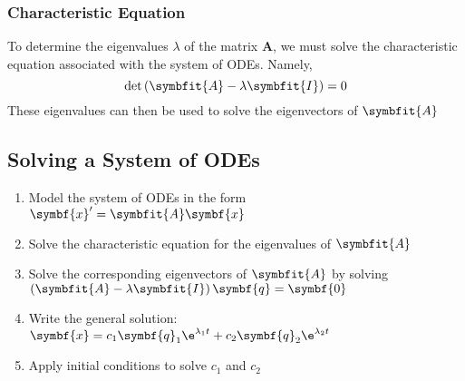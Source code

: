 \documentclass{article}
\begin{document}
\subsubsection{Characteristic Equation}
To determine the eigenvalues $\lambda$ of the matrix $\symbf{A}$, we must solve the characteristic equation
associated with the system of ODEs. Namely,
\begin{equation*}
    \det{\left( \symbfit{A} - \lambda\symbfit{I} \right)} = 0
\end{equation*}
These eigenvalues can then be used to solve the eigenvectors of $\symbfit{A}$
\subsection{Solving a System of ODEs}
\begin{enumerate}
    \item Model the system of ODEs in the form $\symbf{x}' = \symbfit{A} \symbf{x}$
    \item Solve the characteristic equation for the eigenvalues of $\symbfit{A}$
    \item Solve the corresponding eigenvectors of $\symbfit{A}$ by solving $\left( \symbfit{A} - \lambda\symbfit{I} \right) \symbf{q} = \symbf{0}$
    \item Write the general solution: $\symbf{x} = c_1\symbf{q}_1\e^{\lambda_1 t} + c_2\symbf{q}_2\e^{\lambda_2 t}$
    \item Apply initial conditions to solve $c_1$ and $c_2$
\end{enumerate}
\end{document}
